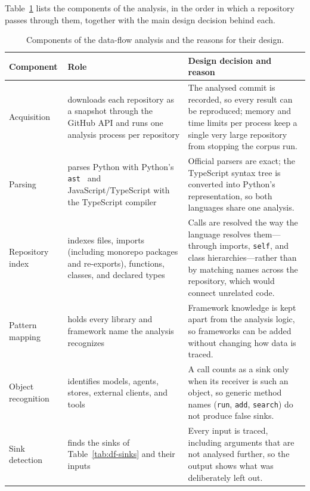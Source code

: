 Table~\ref{tab:df-architecture} lists the components of the analysis, in the order in which a repository passes through them, together with the main design decision behind each.

\begin{table}[t]
\centering
\footnotesize
\renewcommand{\arraystretch}{1.2}
\setlength{\tabcolsep}{4pt}
\caption{Components of the data-flow analysis and the reasons for their design.}
\label{tab:df-architecture}
\begin{tabular}{@{}>{\raggedright\arraybackslash}p{}>{\raggedright\arraybackslash}p{}>{\raggedright\arraybackslash}p{}@{}}
\toprule
\textbf{Component} & \textbf{Role} & \textbf{Design decision and reason} \\
\midrule
Acquisition & downloads each repository as a snapshot through the GitHub API and runs one analysis process per repository & The analysed commit is recorded, so every result can be reproduced; memory and time limits per process keep a single very large repository from stopping the corpus run. \\
Parsing & parses Python with Python's \texttt{ast}~\cite{python-ast} and JavaScript/TypeScript with the TypeScript compiler~\cite{typescript} & Official parsers are exact; the TypeScript syntax tree is converted into Python's representation, so both languages share one analysis. \\
Repository index & indexes files, imports (including monorepo packages and re-exports), functions, classes, and declared types & Calls are resolved the way the language resolves them---through imports, \texttt{self}, and class hierarchies---rather than by matching names across the repository, which would connect unrelated code. \\
Pattern mapping & holds every library and framework name the analysis recognizes & Framework knowledge is kept apart from the analysis logic, so frameworks can be added without changing how data is traced. \\
Object recognition & identifies models, agents, stores, external clients, and tools & A call counts as a sink only when its receiver is such an object, so generic method names (\texttt{run}, \texttt{add}, \texttt{search}) do not produce false sinks. \\
Sink detection & finds the sinks of Table~\ref{tab:df-sinks} and their inputs & Every input is traced, including arguments that are not analysed further, so the output shows what was deliberately left out. \\

\end{tabular}
\end{table}
